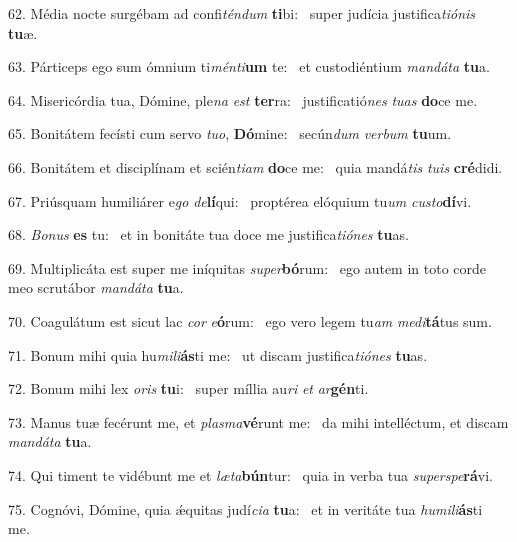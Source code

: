 62. Média nocte surgébam ad confi\textit{tén}\textit{dum} \textbf{ti}bi: \ast\  super judícia justifica\textit{ti}\textit{ó}\textit{nis} \textbf{tu}æ.\

63. Párticeps ego sum ómnium ti\textit{mén}\textit{ti}\textbf{um} te: \ast\  et custodiéntium \textit{man}\textit{dá}\textit{ta} \textbf{tu}a.\

64. Misericórdia tua, Dómine, ple\textit{na} \textit{est} \textbf{ter}ra: \ast\  justificatió\textit{nes} \textit{tu}\textit{as} \textbf{do}ce me.\

65. Bonitátem fecísti cum servo \textit{tu}\textit{o}, \textbf{Dó}mine: \ast\  secún\textit{dum} \textit{ver}\textit{bum} \textbf{tu}um.\

66. Bonitátem et disciplínam et scién\textit{ti}\textit{am} \textbf{do}ce me: \ast\  quia mandá\textit{tis} \textit{tu}\textit{is} \textbf{cré}didi.\

67. Priúsquam humiliárer e\textit{go} \textit{de}\textbf{lí}qui: \ast\  proptérea elóquium tu\textit{um} \textit{cus}\textit{to}\textbf{dí}vi.\

68. \textit{Bo}\textit{nus} \textbf{es} tu: \ast\  et in bonitáte tua doce me justifica\textit{ti}\textit{ó}\textit{nes} \textbf{tu}as.\

69. Multiplicáta est super me iníquitas \textit{su}\textit{per}\textbf{bó}rum: \ast\  ego autem in toto corde meo scrutábor \textit{man}\textit{dá}\textit{ta} \textbf{tu}a.\

70. Coagulátum est sicut lac \textit{cor} \textit{e}\textbf{ó}rum: \ast\  ego vero legem tu\textit{am} \textit{me}\textit{di}\textbf{tá}tus sum.\

71. Bonum mihi quia hu\textit{mi}\textit{li}\textbf{ás}ti me: \ast\  ut discam justifica\textit{ti}\textit{ó}\textit{nes} \textbf{tu}as.\

72. Bonum mihi lex \textit{o}\textit{ris} \textbf{tu}i: \ast\  super míllia au\textit{ri} \textit{et} \textit{ar}\textbf{gén}ti.\

73. Manus tuæ fecérunt me, et \textit{plas}\textit{ma}\textbf{vé}runt me: \ast\  da mihi intelléctum, et discam \textit{man}\textit{dá}\textit{ta} \textbf{tu}a.\

74. Qui timent te vidébunt me et \textit{læ}\textit{ta}\textbf{bún}tur: \ast\  quia in verba tua \textit{su}\textit{per}\textit{spe}\textbf{rá}vi.\

75. Cognóvi, Dómine, quia ǽquitas judí\textit{ci}\textit{a} \textbf{tu}a: \ast\  et in veritáte tua \textit{hu}\textit{mi}\textit{li}\textbf{ás}ti me.\

